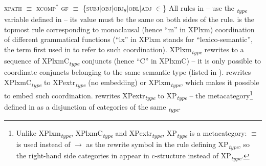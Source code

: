 \documentclass[output=paper]{../langscibook}
\begin{document}
\ea\label{ex:Patejuk2015:5.127}
    \textsc{xpath} $\equiv$ \textsc{xcomp$^{*}$}
\z
\ea\label{ex:Patejuk2015:5.128}
    \textsc{gf} $\equiv$ \{\textsc{subj$\vert$obj$\vert$obj$_{\theta}$$\vert$obl$\vert$adj $\in$}\}
\z
All rules in – use the
\textsubscript{\textit{type}} variable defined in  – its value must
be the same on both sides of the rule.  is the
topmost rule corresponding to monoclausal (hence ``m'' in XPlxm) coordination of different
grammatical functions (``lx'' in XPlxm stands for ``lexico-semantic'',
the term first used in \citet{sann:79,sann:80} to refer to such coordination).
%
XPlxm\textsubscript{\textit{type}} rewrites to a sequence of
XPlxmC\textsubscript{\textit{type}} conjuncts (hence ``C'' in XPlxmC) – it is only possible to coordinate
conjuncts belonging to the same semantic type (listed in
).  rewrites
XPlxmC\textsubscript{\textit{type}} to XPextr\textsubscript{\textit{type}} (no embedding) or XPlxm\textsubscript{\textit{type}},
which makes it possible to embed such coordination.  rewrites XPextr\textsubscript{\textit{type}} to XP\textsubscript{\textit{type}}
– the metacategory\footnote{Unlike XPlxm\textsubscript{\textit{type}}, XPlxmC\textsubscript{\textit{type}} and
  XPextr\textsubscript{\textit{type}}, XP\textsubscript{\textit{type}} is a metacategory: $\equiv$ is used instead
  of $\longrightarrow$ as the rewrite symbol in the rule defining XP\textsubscript{\textit{type}}, so the right-hand
  side categories in  appear in c-structure
  instead of XP\textsubscript{\textit{type}}.} defined in  as
a disjunction of categories of the same \textsubscript{\textit{type}}.
\end{document}
